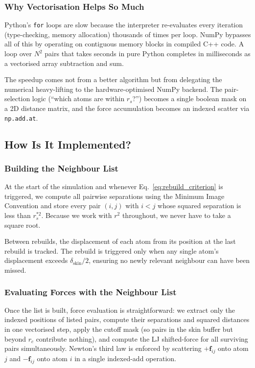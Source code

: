 \subsubsection{Why Vectorisation Helps So Much}

Python's \texttt{for} loops are slow because the interpreter re-evaluates every iteration (type-checking, memory allocation) thousands of times per loop. NumPy bypasses all of this by operating on contiguous memory blocks in compiled C++ code. A loop over $N^2$ pairs that takes seconds in pure Python completes in milliseconds as a vectorised array subtraction and sum.

The speedup comes not from a better algorithm but from delegating the numerical heavy-lifting to the hardware-optimised NumPy backend. The pair-selection logic (``which atoms are within $r_s$?'') becomes a single boolean mask on a 2D distance matrix, and the force accumulation becomes an indexed scatter via \texttt{np.add.at}.

\subsection{How Is It Implemented?}

\subsubsection{Building the Neighbour List}

At the start of the simulation and whenever Eq.~\eqref{eq:rebuild_criterion} is triggered, we compute all pairwise separations using the Minimum Image Convention and store every pair $(i, j)$ with $i < j$ whose squared separation is less than $r_s^{*2}$. Because we work with $r^2$ throughout, we never have to take a square root.

Between rebuilds, the displacement of each atom from its position at the last rebuild is tracked. The rebuild is triggered only when any single atom's displacement exceeds $\delta_\text{skin}/2$, ensuring no newly relevant neighbour can have been missed.

\subsubsection{Evaluating Forces with the Neighbour List}

Once the list is built, force evaluation is straightforward: we extract only the indexed positions of listed pairs, compute their separations and squared distances in one vectorised step, apply the cutoff mask (so pairs in the skin buffer but beyond $r_c$ contribute nothing), and compute the LJ shifted-force for all surviving pairs simultaneously. Newton's third law is enforced by scattering $+\mathbf{f}_{ij}$ onto atom $j$ and $-\mathbf{f}_{ij}$ onto atom $i$ in a single indexed-add operation.


